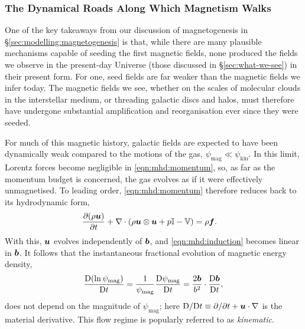 \subsubsection{The Dynamical Roads Along Which Magnetism Walks}
\label{sec:evolve:paths}

One of the key takeaways from our discussion of magnetogenesis in \S\ref{sec:modelling:magnetogenesis} is that, while there are many plausible mechanisms capable of seeding the first magnetic fields, none produced the fields we observe in the present-day Universe (\eg those discussed in \S\ref{sec:what-we-see}) in their present form. For one, seed fields are far weaker than the magnetic fields we infer today. The magnetic fields we see, whether on the scales of molecular clouds in the interstellar medium, or threading galactic discs and halos, must therefore have undergone substantial amplification and reorganisation ever since they were seeded.

For much of this magnetic history, galactic fields are expected to have been dynamically weak compared to the motions of the gas, $\psi_\mathrm{mag} \ll \psi_\mathrm{kin}$. In this limit, Lorentz forces become negligible in \autoref{eqn:mhd:momentum}, so, as far as the momentum budget is concerned, the gas evolves as if it were effectively unmagnetised. To leading order, \autoref{eqn:mhd:momentum} therefore reduces back to its hydrodynamic form,
\begin{align}
    \frac{\partial (\rho \bm{u})}{\partial t}
        + \nabla \cdot \left( 
            \rho \bm{u}\otimes\bm{u}
            + p \mathbb{I}
            - \mathbb{V}
         \right)
        &= \rho \bm{f}
    .
\end{align}
With this, $\bm{u}$ evolves independently of $\bm{b}$, and \autoref{eqn:mhd:induction} becomes linear in $\bm{b}$. It follows that the instantaneous fractional evolution of magnetic energy density,
\begin{align}
    \frac{\mathrm{D} (\ln\psi_\mathrm{mag})}{\mathrm{D} t}
        = \frac{1}{\psi_\mathrm{mag}} \frac{\mathrm{D} \psi_\mathrm{mag}}{\mathrm{D} t}
        = \frac{2\bm{b}}{b^2} \cdot \frac{\mathrm{D} \bm{b}}{\mathrm{D} t}
    ,
\end{align}
does not depend on the magnitude of $\psi_\mathrm{mag}$; here $\mathrm{D} / \mathrm{D} t \equiv \partial/\partial t + \bm{u}\cdot\nabla$ is the material derivative. This flow regime is popularly referred to as \textit{kinematic}.

